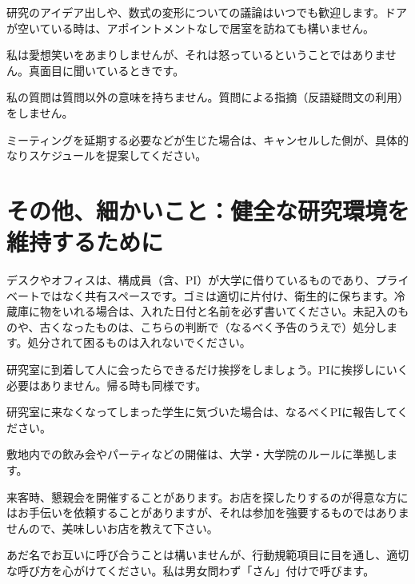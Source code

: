 \documentclass[a4paper,11pt]{ltjsarticle}
\begin{document}
\begin{compactitem}
    \item 研究のアイデア出しや、数式の変形についての議論はいつでも歓迎します。ドアが空いている時は、アポイントメントなしで居室を訪ねても構いません。
    \item 私は愛想笑いをあまりしませんが、それは怒っているということではありません。真面目に聞いているときです。
    \item 私の質問は質問以外の意味を持ちません。質問による指摘（反語疑問文の利用）をしません。
    \item ミーティングを延期する必要などが生じた場合は、キャンセルした側が、具体的なりスケジュールを提案してください。
\end{compactitem}


\section{その他、細かいこと：健全な研究環境を維持するために}
	\begin{compactitem}
		\item デスクやオフィスは、構成員（含、PI）が大学に借りているものであり、プライベートではなく共有スペースです。ゴミは適切に片付け、衛生的に保ちます。冷蔵庫に物をいれる場合は、入れた日付と名前を必ず書いてください。未記入のものや、古くなったものは、こちらの判断で（なるべく予告のうえで）処分します。処分されて困るものは入れないでください。
		\item 研究室に到着して人に会ったらできるだけ挨拶をしましょう。PIに挨拶しにいく必要はありません。帰る時も同様です。
		\item 研究室に来なくなってしまった学生に気づいた場合は、なるべくPIに報告してください。
		\item 敷地内での飲み会やパーティなどの開催は、大学・大学院のルールに準拠します。
		\item 来客時、懇親会を開催することがあります。お店を探したりするのが得意な方にはお手伝いを依頼することがありますが、それは参加を強要するものではありませんので、美味しいお店を教えて下さい。
		\item あだ名でお互いに呼び合うことは構いませんが、行動規範項目に目を通し、適切な呼び方を心がけてください。私は男女問わず「さん」付けで呼びます。
	\end{compactitem}
\end{document}
